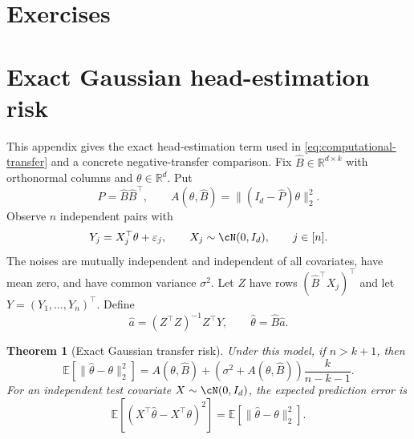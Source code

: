 \documentclass[11pt,twoside]{article}
\newcommand{\E}{\mathbb E}
\newcommand{\R}{\mathbb R}
\newtheorem{theorem}{Theorem}[section]
\theoremstyle{definition}
\theoremstyle{remark}
\renewcommand{\thesection}{13.\arabic{section}}
\begin{document}
\clearpage
\section{Exercises}
\label{sec:exercises}

\exerciseinstructions
\setcounter{courseexercise}{0}










\appendix
\renewcommand{\thesection}{13.\Alph{section}}
\section{Exact Gaussian head-estimation risk}
\label{app:gaussian-transfer}

This appendix gives the exact head-estimation term used in
\cref{eq:computational-transfer} and a concrete negative-transfer comparison.
Fix $\widehat B\in\R^{d\times k}$ with orthonormal columns and
$\theta\in\R^d$. Put
\begin{equation}
 \widehat P=\widehat B\widehat B^\top,
 \qquad
 A(\theta,\widehat B)=\|(I_d-\widehat P)\theta\|_2^2.
 \label{eq:projection-bias}
\end{equation}
Observe $n$ independent pairs with
\begin{equation}
 Y_j=X_j^\top\theta+\varepsilon_j,\qquad
 X_j\sim\cN(0,I_d),\qquad j\in[n].
 \label{eq:new-task-model}
\end{equation}
The noises are mutually independent and independent of all covariates,
have mean zero, and have common variance $\sigma^2$.
Let $Z$ have rows $(\widehat B^\top X_j)^\top$ and let
$Y=(Y_1,\ldots,Y_n)^\top$. Define
\begin{equation}
 \widehat a=(Z^\top Z)^{-1}Z^\top Y,
 \qquad \widehat\theta=\widehat B\widehat a.
 \label{eq:new-task-ols}
\end{equation}

\begin{theorem}[Exact Gaussian transfer risk]
\label{thm:exact-transfer-risk}
Under this model, if $n>k+1$, then
\begin{equation}
 \E[\|\widehat\theta-\theta\|_2^2]
 =A(\theta,\widehat B)
  +(\sigma^2+A(\theta,\widehat B))\frac{k}{n-k-1}.
 \label{eq:exact-transfer-risk}
\end{equation}
For an independent test covariate $X\sim\cN(0,I_d)$, the expected prediction
error is
\begin{equation}
 \E[(X^\top\widehat\theta-X^\top\theta)^2]
 =\E[\|\widehat\theta-\theta\|_2^2].
 \label{eq:prediction-risk-equality}
\end{equation}
\end{theorem}
\end{document}
